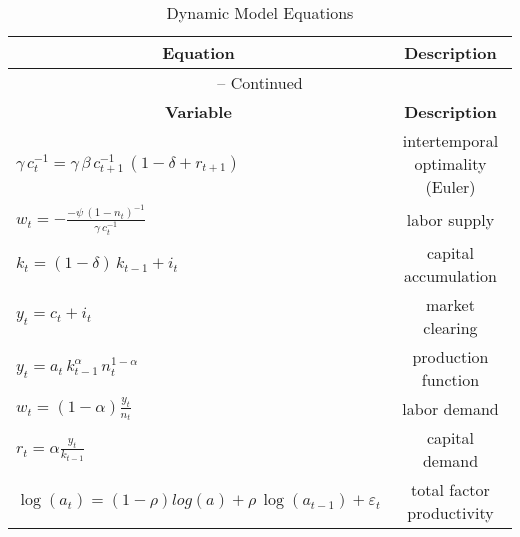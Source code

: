 \begin{center}
\begin{longtable}{lc}
\caption{Dynamic Model Equations}
\label{tbl:RBC.Model}\\%
\hline%
\multicolumn{1}{c}{\textbf{Equation}} &
\multicolumn{1}{c}{\textbf{Description}}\\%
\hline\hline%
\endfirsthead
\multicolumn{2}{c}{{\tablename} \thetable{} -- Continued}\\%
\hline%
\multicolumn{1}{c}{\textbf{Variable}} &
\multicolumn{1}{c}{\textbf{Description}}\\%
\hline\hline%
\endhead
${{\gamma}}\, {{c}}_{t}^{-1}={{\gamma}}\, {{\beta}}\, {{c}}_{t+1}^{-1}\, \left(1-{{\delta}}+{{r}}_{t+1}\right)$ & intertemporal optimality (Euler)
\\
${{w}}_{t}=-\frac{-{{\psi}}\, \left(1-{{n}}_{t}\right)^{-1}}{{{\gamma}}\, {{c}}_{t}^{-1}}$ & labor supply
\\
${{k}}_{t}=\left(1-{{\delta}}\right)\, {{k}}_{t-1}+{{i}}_{t}$ & capital accumulation
\\
${{y}}_{t}={{c}}_{t}+{{i}}_{t}$ & market clearing
\\
${{y}}_{t}={{a}}_{t}\, {{k}}_{t-1}^{{{\alpha}}}\, {{n}}_{t}^{1-{{\alpha}}}$ & production function
\\
${{w}}_{t}=\left(1-{{\alpha}}\right)\frac{{{y}}_{t}}{{{n}}_{t}}$ & labor demand
\\
${{r}}_{t}={{\alpha}}\frac{{{y}}_{t}}{{{k}}_{t-1}}$ & capital demand
\\
$\log\left({{a}}_{t}\right)= (1-\rho) log(a) + {{\rho}}\, \log\left({{a}}_{t-1}\right)+{{\varepsilon}}_{t}$ & total factor productivity
\\
\bottomrule%
\end{longtable}
\end{center}
    
